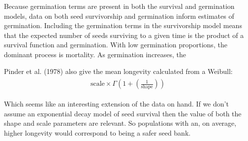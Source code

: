 \documentclass[12pt, oneside, titlepage]{article}   	%
\begin{document}
Because germination terms are present in both the survival and germination models, data on both seed survivorship and germination inform estimates of germination. Including the germination terms in the survivorship model means that the expected number of seeds surviving to a given time is the product of a survival function and germination. With low germination proportions, the dominant process is mortality. As germination increases, the 

Pinder et al. (1978) also give the mean longevity calculated from a Weibull:
%
\begin{align}
  \begin{split}
\mathrm{scale} \times \Gamma(1+(\frac{1}{\mathrm{shape}}))
  \end{split}
\end{align}

Which seems like an interesting extension of the data on hand. If we don't assume an exponential decay model of seed survival then the value of both the shape and scale parameters are relevant. So populations with an, on average, higher longevity would correspond to being a safer seed bank.


\clearpage
\newpage
\fi
\end{document}
